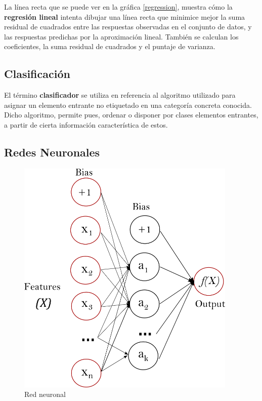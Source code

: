 	La línea recta que se puede ver en la gráfica \ref{regression}, muestra cómo la \textbf{regresión lineal} intenta dibujar una línea recta que minimice mejor la suma residual de cuadrados entre las respuestas observadas en el conjunto de datos, y las respuestas predichas por la aproximación lineal.
	También se calculan los coeficientes, la suma residual de cuadrados y el puntaje de varianza.
	
	\subsection{Clasificación}
	El término \textbf{clasificador} se utiliza en referencia al algoritmo utilizado para asignar un elemento entrante no etiquetado en una categoría concreta conocida. Dicho algoritmo, permite pues, ordenar o disponer por clases elementos entrantes, a partir de cierta información característica de estos.
	
	\subsection{Redes Neuronales}
	
	\begin{figure}[htb]
		
		\begin{center}
			\includegraphics[height=4.5in]{figures/neuronal_network.png}
			\caption{Red neuronal}
		\end{center}
		
		\label{network}
	\end{figure}

